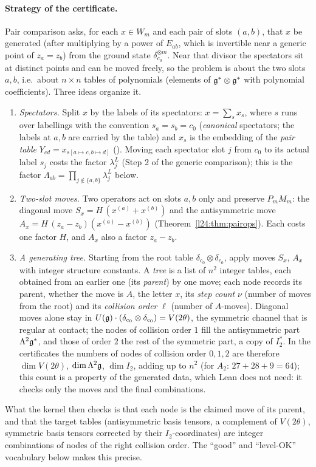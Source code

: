 \paragraph{Strategy of the certificate.} Pair comparison asks, for each $x\in W_m$ and each pair of slots $(a,b)$, that
$x$ be generated (after multiplying by a power of $E_{ab}$, which is invertible near a generic point of $z_a=z_b$) from
the ground state $\delta_{c_0}^{\otimes m}$. Near that divisor the spectators sit at distinct points and can be moved
freely, so the problem is about the two slots $a,b$, i.e.\ about $n\times n$ tables of polynomials (elements of
$\mathfrak g^*\otimes\mathfrak g^*$ with polynomial coefficients). Three ideas organize it.
\begin{enumerate}
\item \emph{Spectators.} Split $x$ by the labels of its spectators: $x=\sum_sx_s$, where $s$ runs over labellings with
  the convention $s_a=s_b=c_0$ (\emph{canonical} spectators; the labels at $a,b$ are carried by the table) and $x_s$ is the
  embedding of the \emph{pair table} $Y_{cd}=x_{s[a\mapsto c,b\mapsto d]}$ (). Moving each spectator
  slot $j$ from $c_0$ to its actual label $s_j$ costs the factor $\lambda_j^L$ (Step 2 of the generic comparison); this is the
  factor $\Lambda_{ab}=\prod_{j\notin\{a,b\}}\lambda_j^L$ below.
\item \emph{Two-slot moves.} Two operators act on slots $a,b$ only and preserve $P_mM_m$: the diagonal move
  $S_x=H\,(x^{(a)}+x^{(b)})$ and the antisymmetric move $A_x=H\,(z_a-z_b)(x^{(a)}-x^{(b)})$ (Theorem~\ref{l24:thm:pairops}).
  Each costs one factor $H$, and $A_x$ also a factor $z_a-z_b$.
\item \emph{A generating tree.} Starting from the root table $\delta_{c_0}\otimes\delta_{c_0}$, apply moves $S_x$, $A_x$
  with integer structure constants. A \emph{tree} is a list of $n^2$ integer tables, each obtained from an earlier one (its
  \emph{parent}) by one move; each node records its parent, whether the move is $A$, the letter $x$, its \emph{step count}
  $\nu$ (number of moves from the root) and its \emph{collision order} $\ell$ (number of $A$-moves). Diagonal moves alone
  stay in $U(\mathfrak g)\cdot(\delta_{c_0}\otimes\delta_{c_0})=V(2\theta)$, the symmetric channel that is regular at contact;
  the nodes of collision order $1$ fill the antisymmetric part $\Lambda^2\mathfrak g^*$, and those of order $2$ the rest of the
  symmetric part, a copy of $I_2^*$. In the certificates the numbers of nodes of collision order $0,1,2$ are therefore
  $\dim V(2\theta)$, $\dim\Lambda^2\mathfrak g$, $\dim I_2$, adding up to $n^2$ (for $A_2$: $27+28+9=64$); this count is a
  property of the generated data, which Lean does not need: it checks only the moves and the final combinations.
\end{enumerate}
What the kernel then checks is that each node is the claimed move of its parent, and that the target tables (antisymmetric
basis tensors, a complement of $V(2\theta)$, symmetric basis tensors corrected by their $I_2$-coordinates) are integer
combinations of nodes of the right collision order. The ``good'' and ``level-OK'' vocabulary below makes this precise.

